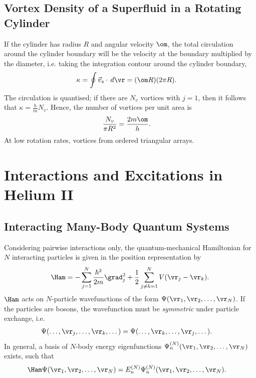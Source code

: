 \documentclass[qo.tex]{subfiles}
\begin{document}
\section{Vortex Density of a Superfluid in a Rotating Cylinder}
If the cylinder has radius $R$ and angular velocity $\om$, the total circulation around the cylinder boundary will be the velocity at the boundary multiplied by the diameter, i.e. taking the integration contour around the cylinder boundary,
\begin{align}
    \kappa &= \oint \vec{v}_s\cdot\,d\vr = (\om R)(2\pi R).
\end{align}
The circulation is quantised; if there are $N_v$ vortices with $j=1$, then it follows that $\kappa=\frac{h}{m}N_v$.
Hence, the number of vortices per unit area is
\begin{align}
    \frac{N_v}{\pi R^2} &= \frac{2m\om}{h}.
\end{align}
At low rotation rates, vortices from ordered triangular arrays.

\chapter{Interactions and Excitations in Helium II}
\section{Interacting Many-Body Quantum Systems}
Considering pairwise interactions only, the quantum-mechanical Hamiltonian for $N$ interacting particles is given in the position representation by 
\begin{align}
    \Ham = -\sum_{j=1}^N \frac{\hbar^2}{2m}\grad_j^2 + \frac12\sum_{j\neq k=1}^N V(\vr_j-\vr_k).
\end{align}
$\Ham$ acts on $N$-particle wavefunctions of the form $\Psi(\vr_1,\vr_2,\dots,\vr_N)$.
If the particles are bosons, the wavefunction must be \emph{symmetric} under particle exchange, i.e.
\begin{align}
    \Psi(\dots,\vr_j,\dots,\vr_k,\dots) &= \Psi(\dots,\vr_k,\dots,\vr_j,\dots).
\end{align}
In general, a basis of $N$-body energy eigenfunctions $\Psi_n^{(N)}(\vr_1,\vr_2,\dots,\vr_N)$ exists, such that 
\begin{align}
    \Ham\Psi(\vr_1,\vr_2,\dots,\vr_N) &= E_n^{(N)}\Psi_n^{(N)}(\vr_1,\vr_2,\dots,\vr_N).
\end{align}
\end{document}
